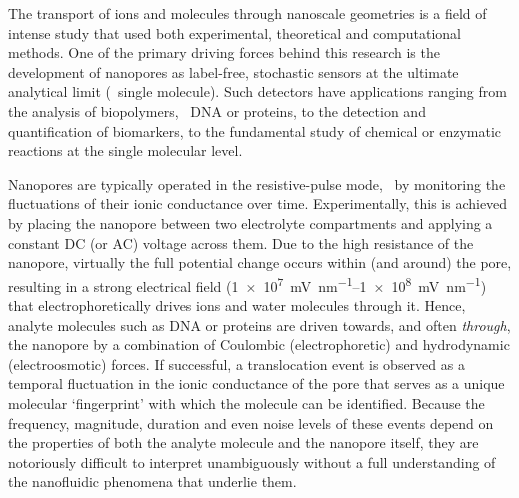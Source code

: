 \documentclass[journal=ancac3,manuscript=article,etalmode=truncate,maxauthors=0,layout=onecolumn]{achemso}
\begin{document}
The transport of ions and molecules through nanoscale geometries is a field of intense study that used both
experimental, theoretical and computational methods.\cite{Sparreboom-2010,Bocquet-2010,Maffeo-2012,
Thomas-2014,Wang-2014,Kim-2015} One of the primary driving forces behind this research is the development of
nanopores as label-free, stochastic sensors at the ultimate analytical limit (\ie{}~single molecule).
\cite{Bayley-2001,Dekker-2007,Venkatesan-2011,Zhang-2016} Such detectors have applications ranging from
the analysis of biopolymers,
\ie~DNA\cite{Deamer-2016,Kasianowicz-1996,Meller-2000,Maglia-2008,Butler-2008,Stoddart-2009,Franceschini-2013,Jain-2018}
or proteins,\cite{Restrepo-Perez-2018,Talaga-2009,Rodriguez-Larrea-2013, Nivala-2013,Kennedy-2016} to the
detection and quantification of
biomarkers,\cite{Chen-2013,Soskine-2012,Niedzwiecki-2013,VanMeervelt-2014,Huang-2017,Liu-2018,Galenkamp-2018}
to the fundamental study of chemical or enzymatic reactions at the single molecular
level.\cite{Willems-VanMeervelt-2017,Lieberman-2010, Nivala-2013,Ho-2015,Laszlo-2017}

Nanopores are typically operated in the resistive-pulse mode, \ie~by monitoring the fluctuations of their
ionic conductance over time.\cite{Bayley-2001,Dekker-2007,Maglia-2010,Venkatesan-2011} Experimentally, this is
achieved by placing the nanopore between two electrolyte compartments and applying a constant DC (or AC)
voltage across them. Due to the high resistance of the nanopore, virtually the full potential change occurs
within (and around) the pore, resulting in a strong electrical field (\SIrange{1e7}{1e8}{\mV\per\nm}) that
electrophoretically drives ions and water molecules through
it.\cite{Wong-2007,Mao-2014,Haywood-2014,Laohakunakorn-2015} Hence, analyte molecules such as DNA or proteins
are driven towards, and often \emph{through}, the nanopore by a combination of Coulombic (electrophoretic) and
hydrodynamic (electroosmotic) forces.\cite{Wong-2007,Grosberg-2010,Muthukumar-2010, Muthukumar-2014} If
successful, a translocation event is observed as a temporal fluctuation in the ionic conductance of the pore
that serves as a unique molecular `fingerprint' with which the molecule can be identified.\cite{Yusko-2017}
Because the frequency, magnitude, duration and even noise levels of these events depend on the properties of
both the analyte molecule and the nanopore itself, they are notoriously difficult to interpret unambiguously
without a full understanding of the nanofluidic phenomena that underlie them.
\end{document}
